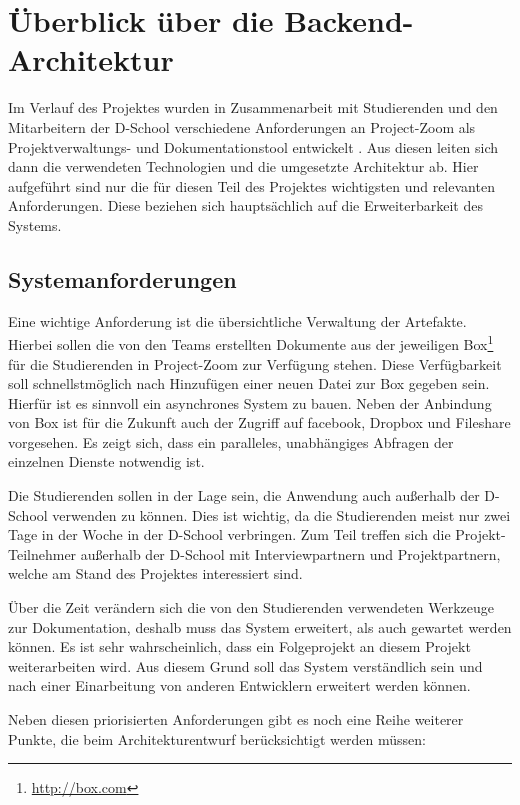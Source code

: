 \chapter{Überblick über die Backend-Architektur}
Im Verlauf des Projektes wurden in Zusammenarbeit mit Studierenden und den Mitarbeitern der D-School verschiedene Anforderungen an Project-Zoom als Projektverwaltungs- und Dokumentationstool entwickelt \cite{requirements}.  Aus diesen leiten sich dann die verwendeten Technologien und die umgesetzte Architektur ab. Hier aufgeführt sind nur die für diesen Teil des Projektes wichtigsten und relevanten Anforderungen. Diese beziehen sich hauptsächlich auf die Erweiterbarkeit des Systems.

\section{Systemanforderungen}
Eine wichtige Anforderung ist die übersichtliche Verwaltung der Artefakte. Hierbei sollen die von den Teams erstellten Dokumente aus der jeweiligen \gls{Box}\footnote{\url{http://box.com}} für die Studierenden in Project-Zoom zur Verfügung stehen. Diese Verfügbarkeit soll schnellstmöglich nach Hinzufügen einer neuen Datei zur \gls{Box} gegeben sein. Hierfür ist es sinnvoll ein asynchrones System zu bauen.  Neben der Anbindung von \gls{Box} ist für die Zukunft auch der Zugriff auf facebook, Dropbox und Fileshare vorgesehen. Es zeigt sich, dass ein paralleles, unabhängiges Abfragen der einzelnen Dienste notwendig ist.

Die Studierenden sollen in der Lage sein, die Anwendung auch außerhalb der D-School verwenden zu können. Dies ist wichtig, da die Studierenden meist nur zwei Tage in der Woche in der D-School verbringen. Zum Teil treffen sich die Projekt-Teilnehmer außerhalb der D-School mit Interviewpartnern und Projektpartnern, welche am Stand des Projektes interessiert sind. 

Über die Zeit verändern sich die von den Studierenden verwendeten Werkzeuge zur Dokumentation, deshalb muss das System erweitert, als auch gewartet werden können. Es ist sehr wahrscheinlich, dass ein Folgeprojekt an diesem Projekt weiterarbeiten wird. Aus diesem Grund soll das System verständlich sein und nach einer Einarbeitung von anderen Entwicklern erweitert werden können. 

Neben diesen priorisierten Anforderungen gibt es noch eine Reihe weiterer Punkte, die beim Architekturentwurf berücksichtigt werden müssen:
 
